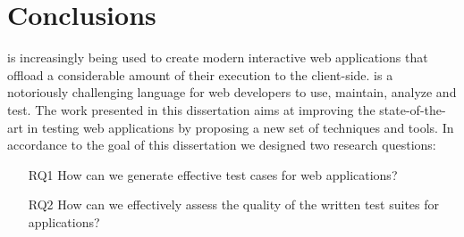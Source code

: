 \chapter{Conclusions} \label{Chap:conc}
\javascript is increasingly being used to create modern interactive web applications that offload a considerable amount of their execution to the client-side. \javascript is a notoriously challenging language for web developers to use, maintain, analyze and test. %
The work presented in this dissertation aims at improving the state-of-the-art in testing \javascript web applications by proposing a new set of techniques and tools.
In accordance to the goal of this dissertation we designed two research questions:
\begin{itemize}
\item [RQ1] How can we generate effective test cases for \javascript web applications?
\item [RQ2] How can we effectively assess the quality of the written test suites for \javascript applications?
\end{itemize}

